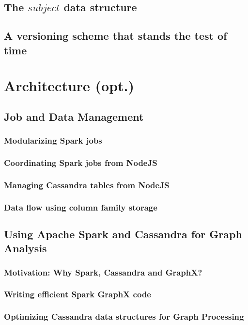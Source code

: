 \documentclass[
        a4paper,     %
        titlepage,   %
        twoside,     %
        parskip      %
        ]{scrartcl}  %
\begin{document}
    \subsection{The $subject$ data structure}
    \subsection{A versioning scheme that stands the test of time}
    \pagebreak

  \section{Architecture (opt.)}
    \subsection{Job and Data Management}
      \subsubsection{Modularizing Spark jobs}
      \subsubsection{Coordinating Spark jobs from NodeJS}
      \subsubsection{Managing Cassandra tables from NodeJS}
      \subsubsection{Data flow using column family storage}
    \subsection{Using Apache Spark and Cassandra for Graph Analysis}
      \subsubsection{Motivation: Why Spark, Cassandra and GraphX?}
      \subsubsection{Writing efficient Spark GraphX code}
      \subsubsection{Optimizing Cassandra data structures for Graph Processing}
    \pagebreak
\end{document}
